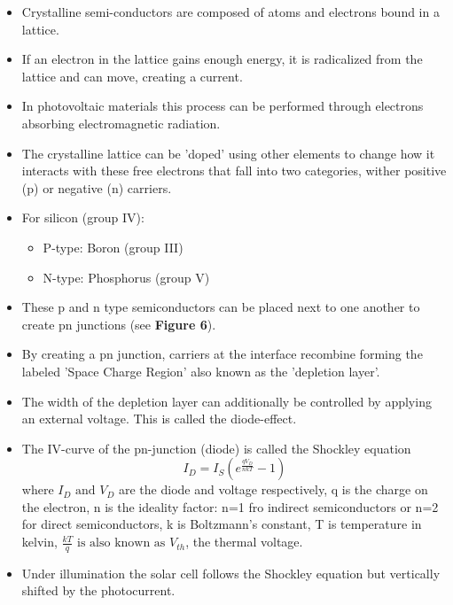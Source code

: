 \documentclass{article}
\begin{document}
    \begin{itemize}
        \item Crystalline semi-conductors are composed of atoms and electrons bound in a lattice.
        \item If an electron in the lattice gains enough energy, it is radicalized from the lattice and can move, creating a current.
        \item In photovoltaic materials this process can be performed through electrons absorbing electromagnetic radiation.
        \item The crystalline lattice can be 'doped' using other elements to change how it interacts with these free electrons that fall into
        two categories, wither positive (p) or negative (n) carriers.
        \newpage
        \item For silicon (group IV):
            \begin{itemize}
                \item P-type: Boron (group III)
                \item N-type: Phosphorus (group V)
            \end{itemize}
        \item These p and n type semiconductors can be placed next to one another to create pn junctions (see \textbf{Figure 6}).
        \item By creating a pn junction, carriers at the interface recombine forming the labeled 'Space Charge Region' also known as the 'depletion layer'.
        \item The width of the depletion layer can additionally be controlled by applying an external voltage. This is called the diode-effect.
        \item The IV-curve of the pn-junction (diode) is called the Shockley equation
        \begin{equation}
            I_D = I_S (e^{\frac{qV_D}{nkT}}-1)
        \end{equation}
        where \(I_D \text{ and } V_D\) are the diode and voltage respectively, q is the charge on the electron, 
        n is the ideality factor: n=1 fro indirect semiconductors or n=2 for direct semiconductors, k is Boltzmann's constant, T is temperature in kelvin, 
        \(\frac{kT}{q} \text{ is also known as } V_{th}\), the thermal voltage.
        \item Under illumination the solar cell follows the Shockley equation but vertically shifted by the photocurrent.
    \end{itemize}
\end{document}
